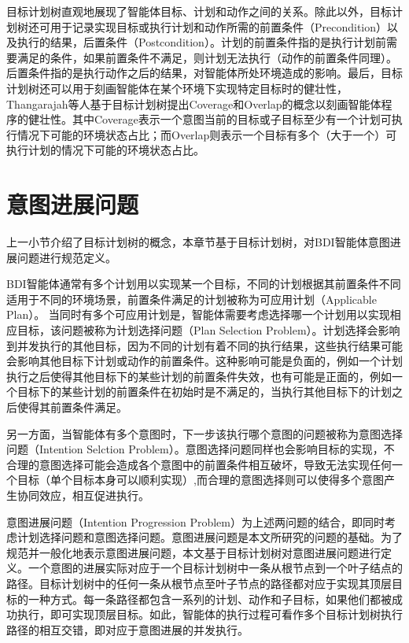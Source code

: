 目标计划树直观地展现了智能体目标、计划和动作之间的关系。除此以外，目标计划树还可用于记录实现目标或执行计划和动作所需的前置条件（Precondition）以及执行的结果，后置条件（Postcondition）。计划的前置条件指的是执行计划前需要满足的条件，如果前置条件不满足，则计划无法执行（动作的前置条件同理）。后置条件指的是执行动作之后的结果，对智能体所处环境造成的影响。最后，目标计划树还可以用于刻画智能体在某个环境下实现特定目标时的健壮性，Thangarajah等人基于目标计划树提出Coverage和Overlap的概念\cite{DBLP:conf/aamas/ThangarajahSP12}以刻画智能体程序的健壮性。其中Coverage表示一个意图当前的目标或子目标至少有一个计划可执行情况下可能的环境状态占比；而Overlap则表示一个目标有多个（大于一个）可执行计划的情况下可能的环境状态占比。

\section{意图进展问题}
上一小节介绍了目标计划树的概念，本章节基于目标计划树，对BDI智能体意图进展问题进行规范定义。

BDI智能体通常有多个计划用以实现某一个目标，不同的计划根据其前置条件不同适用于不同的环境场景，前置条件满足的计划被称为可应用计划（Applicable Plan）。
当同时有多个可应用计划是，智能体需要考虑选择哪一个计划用以实现相应目标，该问题被称为计划选择问题（Plan Selection Problem）。计划选择会影响到并发执行的其他目标，因为不同的计划有着不同的执行结果，这些执行结果可能会影响其他目标下计划或动作的前置条件。这种影响可能是负面的，例如一个计划执行之后使得其他目标下的某些计划的前置条件失效，也有可能是正面的，例如一个目标下的某些计划的前置条件在初始时是不满足的，当执行其他目标下的计划之后使得其前置条件满足。

另一方面，当智能体有多个意图时，下一步该执行哪个意图的问题被称为意图选择问题（Intention Selction Problem）。意图选择问题同样也会影响目标的实现，不合理的意图选择可能会造成各个意图中的前置条件相互破坏，导致无法实现任何一个目标（单个目标本身可以顺利实现）,而合理的意图选择则可以使得多个意图产生协同效应，相互促进执行。

意图进展问题（Intention Progression Problem）为上述两问题的结合，即同时考虑计划选择问题和意图选择问题。意图进展问题是本文所研究的问题的基础。为了规范并一般化地表示意图进展问题，本文基于目标计划树对意图进展问题进行定义。一个意图的进展实际对应于一个目标计划树中一条从根节点到一个叶子结点的路径。目标计划树中的任何一条从根节点至叶子节点的路径都对应于实现其顶层目标的一种方式。每一条路径都包含一系列的计划、动作和子目标，如果他们都被成功执行，即可实现顶层目标。如此，智能体的执行过程可看作多个目标计划树执行路径的相互交错，即对应于意图进展的并发执行。

